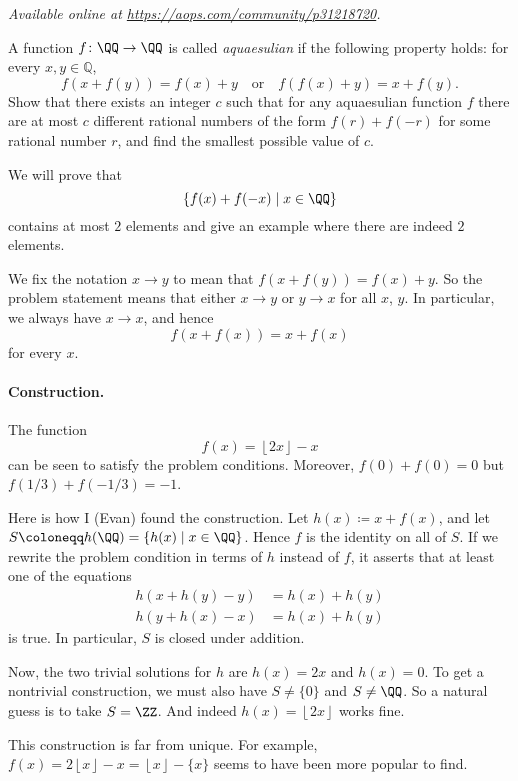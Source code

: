 
\textsl{Available online at \url{https://aops.com/community/p31218720}.}
\begin{mdframed}[style=mdpurplebox,frametitle={Problem statement}]
A function $f \colon \QQ \to \QQ$ is called \emph{aquaesulian}
if the following property holds: for every $x,y \in \mathbb{Q}$,
\[ f(x+f(y)) = f(x) + y \quad \text{or} \quad f(f(x)+y) = x + f(y). \]
Show that there exists an integer $c$ such that for any aquaesulian function $f$
there are at most $c$ different rational numbers of the
form $f(r) + f(-r)$ for some rational number $r$,
and find the smallest possible value of $c$.
\end{mdframed}
We will prove that
\[ \left\{ f(x) + f(-x) \mid x \in \QQ \right\} \]
contains at most $2$ elements
and give an example where there are indeed $2$ elements.

We fix the notation $x \to y$ to mean that $f(x+f(y)) = f(x)+y$.
So the problem statement means that either $x \to y$ or $y \to x$ for all $x$, $y$.
In particular, we always have $x \to x$, and hence
\[ f(x+f(x)) = x+f(x) \]
for every $x$.

\paragraph{Construction.}
The function
\[ f(x) = \left\lfloor 2x \right\rfloor - x \]
can be seen to satisfy the problem conditions.
Moreover, $f(0)+f(0) = 0$ but $f(1/3)+f(-1/3) = -1$.

\begin{remark*}
  Here is how I (Evan) found the construction.
  Let $h(x) \coloneqq x+f(x)$, and let $S \coloneqq h(\QQ) = \{h(x) \mid x \in \QQ\}$.
  Hence $f$ is the identity on all of $S$.
  If we rewrite the problem condition in terms of $h$ instead of $f$,
  it asserts that at least one of the equations
  \begin{align*}
    h(x+h(y)-y) &= h(x)+h(y) \\
    h(y+h(x)-x) &= h(x)+h(y)
  \end{align*}
  is true.
  In particular, $S$ is closed under addition.

  Now, the two trivial solutions for $h$ are $h(x) = 2x$ and $h(x) = 0$.
  To get a nontrivial construction, we must also have $S \neq \{0\}$ and $S \neq \QQ$.
  So a natural guess is to take $S = \ZZ$.
  And indeed $h(x) = \left\lfloor 2x \right\rfloor$ works fine.
\end{remark*}
\begin{remark*}
  This construction is far from unique. For example,
  $f(x) = 2\left\lfloor x \right\rfloor - x = \left\lfloor x \right\rfloor - \{x\}$
  seems to have been more popular to find.
\end{remark*}

